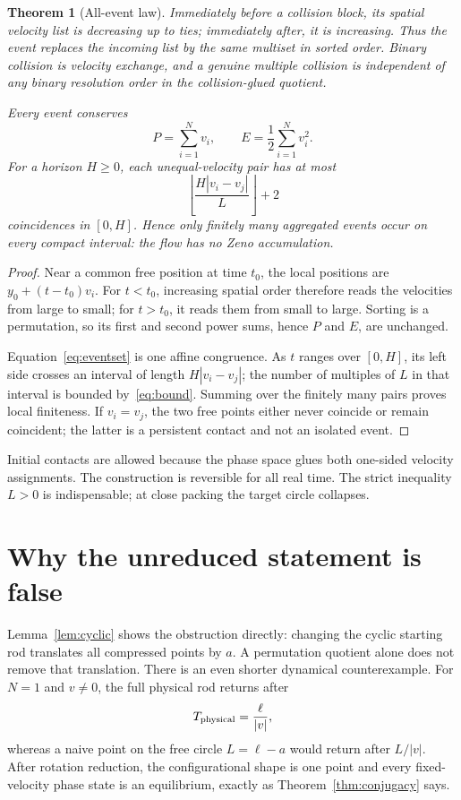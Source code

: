 \documentclass[10pt]{article}
\newtheorem{theorem}{Theorem}
\begin{document}
\begin{theorem}[All-event law]\label{thm:events}
Immediately before a collision block, its spatial velocity list is decreasing
up to ties; immediately after, it is increasing.  Thus the event replaces the
incoming list by the same multiset in sorted order.  Binary collision is
velocity exchange, and a genuine multiple collision is independent of any
binary resolution order in the collision-glued quotient.

Every event conserves
\[
 P=\sum_{i=1}^Nv_i,
 \qquad
 E=\frac12\sum_{i=1}^Nv_i^2.
\]
For a horizon $H\geq0$, each unequal-velocity pair has at most
\begin{equation}\label{eq:bound}
 \left\lfloor\frac{H|v_i-v_j|}{L}\right\rfloor+2
\end{equation}
coincidences in $[0,H]$.  Hence only finitely many aggregated events occur on
every compact interval: the flow has no Zeno accumulation.
\end{theorem}
\begin{proof}
Near a common free position at time $t_0$, the local positions are
$y_0+(t-t_0)v_i$.  For $t<t_0$, increasing spatial order therefore reads the
velocities from large to small; for $t>t_0$, it reads them from small to large.
Sorting is a permutation, so its first and second power sums, hence $P$ and
$E$, are unchanged.

Equation~\eqref{eq:eventset} is one affine congruence.  As $t$ ranges over
$[0,H]$, its left side crosses an interval of length $H|v_i-v_j|$; the number
of multiples of $L$ in that interval is bounded by~\eqref{eq:bound}.  Summing
over the finitely many pairs proves local finiteness.  If $v_i=v_j$, the two
free points either never coincide or remain coincident; the latter is a
persistent contact and not an isolated event.
\end{proof}

Initial contacts are allowed because the phase space glues both one-sided
velocity assignments.  The construction is reversible for all real time.
The strict inequality $L>0$ is indispensable; at close packing the target
circle collapses.

\section{Why the unreduced statement is false}
Lemma~\ref{lem:cyclic} shows the obstruction directly: changing the cyclic
starting rod translates all compressed points by $a$.  A permutation quotient
alone does not remove that translation.  There is an even shorter dynamical
counterexample.  For $N=1$ and $v\ne0$, the full physical rod returns after
\begin{equation}\label{eq:falseperiod}
 T_{\rm physical}=\frac{\ell}{|v|},
\end{equation}
whereas a naive point on the free circle $L=\ell-a$ would return after
$L/|v|$.  After rotation reduction, the configurational shape is one point
and every fixed-velocity phase state is an equilibrium, exactly as
Theorem~\ref{thm:conjugacy} says.
\end{document}
